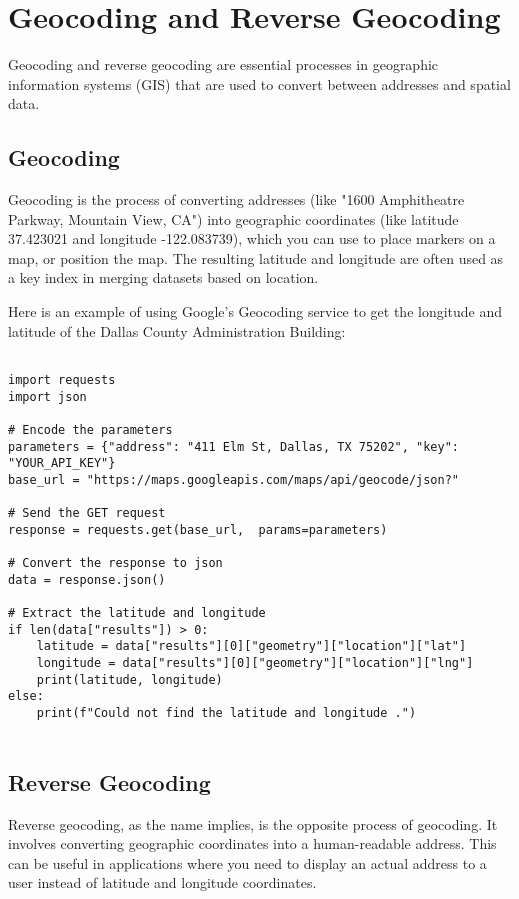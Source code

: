 \chapter{Geocoding and Reverse Geocoding}

Geocoding and reverse geocoding are essential processes in geographic
information systems (GIS) that are used to convert between addresses
and spatial data.

\section{Geocoding}

Geocoding is the process of converting addresses (like "1600
Amphitheatre Parkway, Mountain View, CA") into geographic coordinates
(like latitude 37.423021 and longitude -122.083739), which you can use
to place markers on a map, or position the map. The resulting latitude
and longitude are often used as a key index in merging datasets based
on location.

Here is an example of using Google's Geocoding service to get the
longitude and latitude of the Dallas County Administration Building:

\begin{verbatim}

import requests
import json

# Encode the parameters
parameters = {"address": "411 Elm St, Dallas, TX 75202", "key": "YOUR_API_KEY"}
base_url = "https://maps.googleapis.com/maps/api/geocode/json?"

# Send the GET request
response = requests.get(base_url,  params=parameters)

# Convert the response to json
data = response.json()

# Extract the latitude and longitude
if len(data["results"]) > 0:
    latitude = data["results"][0]["geometry"]["location"]["lat"]
    longitude = data["results"][0]["geometry"]["location"]["lng"]
    print(latitude, longitude)
else:
    print(f"Could not find the latitude and longitude .")
    
\end{verbatim}

\section{Reverse Geocoding}

Reverse geocoding, as the name implies, is the opposite process of
geocoding. It involves converting geographic coordinates into a
human-readable address. This can be useful in applications where you
need to display an actual address to a user instead of latitude and
longitude coordinates.

